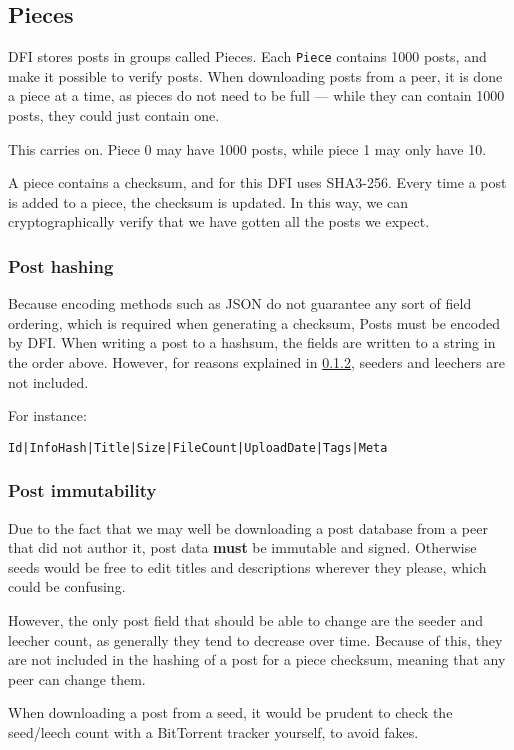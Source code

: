 \subsection{Pieces}
\begin{multicols}{2}
DFI stores posts in groups called Pieces. Each \texttt{Piece} contains 1000 posts, and
make it possible to verify posts. When downloading posts from a peer, it is done
a piece at a time, as pieces do not need to be full --- while they can contain
1000 posts, they could just contain one.

This carries on. Piece 0 may have 1000 posts, while piece 1 may only have 10.

A piece contains a checksum, and for this DFI uses SHA3-256. Every time a post
is added to a piece, the checksum is updated. In this way, we can
cryptographically verify that we have gotten all the posts we expect.
\end{multicols}

\subsubsection{Post hashing}
\begin{multicols}{2}
Because encoding methods such as JSON do not guarantee any sort of field
ordering, which is required when generating a checksum, Posts must be encoded by
DFI. When writing a post to a hashsum, the fields are written to a string in the
order above. However, for reasons explained in \ref{secPostImmutability}, seeders and leechers are not
included. 

For instance:
\end{multicols}
\begin{lstlisting}
Id|InfoHash|Title|Size|FileCount|UploadDate|Tags|Meta
\end{lstlisting}

\pagebreak
\subsubsection{Post immutability}
\label{secPostImmutability}
\begin{multicols}{2}
Due to the fact that we may well be downloading a post database from a peer
that did not author it, post data \textbf{must} be immutable and signed. Otherwise seeds
would be free to edit titles and descriptions wherever they please, which could
be confusing.

However, the only post field that should be able to change are the seeder and
leecher count, as generally they tend to decrease over time. Because of this,
they are not included in the hashing of a post for a piece checksum, meaning
that any peer can change them. 

When downloading a post from a seed, it would be prudent to check the
seed/leech count with a BitTorrent tracker yourself, to avoid fakes.
\end{multicols}

